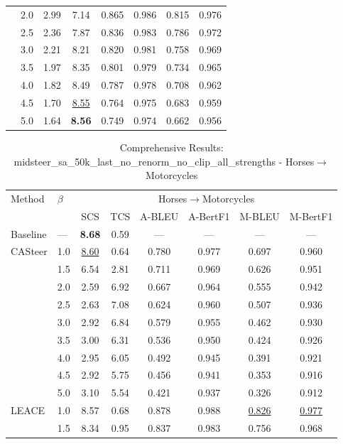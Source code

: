 \begin{table}[htbp]
\begin{tabular}{l|l|cccccc|}
 & 2.0 & 2.99 & 7.14 & 0.865 & 0.986 & 0.815 & 0.976 \\
 & 2.5 & 2.36 & 7.87 & 0.836 & 0.983 & 0.786 & 0.972 \\
 & 3.0 & 2.21 & 8.21 & 0.820 & 0.981 & 0.758 & 0.969 \\
 & 3.5 & 1.97 & 8.35 & 0.801 & 0.979 & 0.734 & 0.965 \\
 & 4.0 & 1.82 & 8.49 & 0.787 & 0.978 & 0.708 & 0.962 \\
 & 4.5 & 1.70 & \underline{8.55} & 0.764 & 0.975 & 0.683 & 0.959 \\
 & 5.0 & 1.64 & \textbf{8.56} & 0.749 & 0.974 & 0.662 & 0.956 \\
\hline
\end{tabular}
\end{table}

\begin{table}[htbp]
\centering
\caption{Comprehensive Results: midsteer\_sa\_50k\_last\_no\_renorm\_no\_clip\_all\_strengths - Horses$\to$Motorcycles}
\label{tab:single_experiment_table_without_clipping_horses_to_motorcycles}
\begin{tabular}{l|l|cccccc|}
\hline
Method & $\beta$ & \multicolumn{6}{c|}{Horses$\rightarrow$Motorcycles} \\
 &  & SCS & TCS & A-BLEU & A-BertF1 & M-BLEU & M-BertF1 \\
\hline
Baseline & — & \textbf{8.68} & 0.59 & — & — & — & — \\
\hline
CASteer & 1.0 & \underline{8.60} & 0.64 & 0.780 & 0.977 & 0.697 & 0.960 \\
 & 1.5 & 6.54 & 2.81 & 0.711 & 0.969 & 0.626 & 0.951 \\
 & 2.0 & 2.59 & 6.92 & 0.667 & 0.964 & 0.555 & 0.942 \\
 & 2.5 & 2.63 & 7.08 & 0.624 & 0.960 & 0.507 & 0.936 \\
 & 3.0 & 2.92 & 6.84 & 0.579 & 0.955 & 0.462 & 0.930 \\
 & 3.5 & 3.00 & 6.31 & 0.536 & 0.950 & 0.424 & 0.926 \\
 & 4.0 & 2.95 & 6.05 & 0.492 & 0.945 & 0.391 & 0.921 \\
 & 4.5 & 2.92 & 5.75 & 0.456 & 0.941 & 0.353 & 0.916 \\
 & 5.0 & 3.10 & 5.54 & 0.421 & 0.937 & 0.326 & 0.912 \\
\hline
LEACE & 1.0 & 8.57 & 0.68 & 0.878 & 0.988 & \underline{0.826} & \underline{0.977} \\
 & 1.5 & 8.34 & 0.95 & 0.837 & 0.983 & 0.756 & 0.968 \\

\end{tabular}
\end{table}
